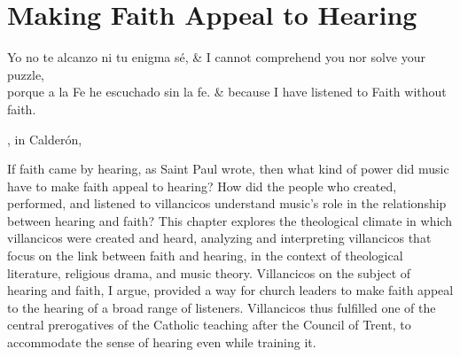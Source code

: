 
%
%
%


\chapter{Making Faith Appeal to Hearing}
\label{ch:faith-hearing}

\epigraph{%
    \begin{quotepoem}
        Yo no te alcanzo ni tu enigma sé,
        & I cannot comprehend you nor solve your puzzle, \\

        porque a la Fe he escuchado sin la fe.
        & because I have listened to Faith without faith.
    \end{quotepoem}%
}{%
    , in Calderón, %
        \Autocite[]{Calderon:Retiro}%
} %

If faith came by hearing, as Saint Paul wrote, then what kind of power did music
have to make faith appeal to hearing?
How did the people who created, performed, and listened to villancicos
understand music's role in the relationship between hearing and faith?
This chapter explores the theological climate in which villancicos were created
and heard, analyzing and interpreting villancicos that focus on the link between
faith and hearing, in the context of theological literature, religious drama,
and music theory.
Villancicos on the subject of hearing and faith, I argue, provided a way for
church leaders to make faith appeal to the hearing of a broad range of
listeners.
Villancicos thus fulfilled one of the central prerogatives of the Catholic
teaching after the Council of Trent, to accommodate the sense of
hearing even while training it.

